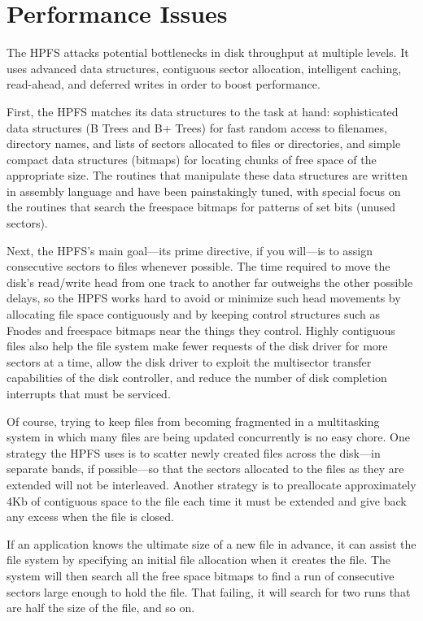 \section{\heads Performance Issues}
 
The HPFS attacks potential bottlenecks in disk throughput at multiple levels.
It uses advanced data structures, contiguous sector allocation, intelligent
caching, read-ahead, and deferred writes in order to boost performance.
 
First, the HPFS matches its data structures to the task at hand:
sophisticated data structures (B Trees and B+ Trees) for fast random access
to filenames, directory names, and lists of sectors allocated to files or
directories, and simple compact data structures (bitmaps) for locating chunks
of free space of the appropriate size.  The routines that manipulate these
data structures are written in assembly language and have been painstakingly
tuned, with special focus on the routines that search the freespace bitmaps
for patterns of set bits (unused sectors).
 
Next, the HPFS's main goal---its prime directive, if you will---is to assign
consecutive sectors to files whenever possible.  The time required to move
the disk's read/write head from one track to another far outweighs the other
possible delays, so the HPFS works hard to avoid or minimize such head
movements by allocating file space contiguously and by keeping control
structures such as Fnodes and freespace bitmaps near the things they control.
Highly contiguous files also help the file system make fewer requests of the
disk driver for more sectors at a time, allow the disk driver to exploit the
multisector transfer capabilities of the disk controller, and reduce the
number of disk completion interrupts that must be serviced.
 
Of course, trying to keep files from becoming fragmented in a multitasking
system in which many files are being updated concurrently is no easy chore.
One strategy the HPFS uses is to scatter newly created files across the
disk---in separate bands, if possible---so that the sectors allocated to the
files as they are extended will not be interleaved.  Another strategy is to
preallocate approximately 4Kb of contiguous space to the file each time it
must be extended and give back any excess when the file is closed.
 
If an application knows the ultimate size of a new file in advance, it can
assist the file system by specifying an initial file allocation when it
creates the file.  The system will then search all the free space bitmaps to
find a run of consecutive sectors large enough to hold the file.  That
failing, it will search for two runs that are half the size of the file, and
so on.
 
